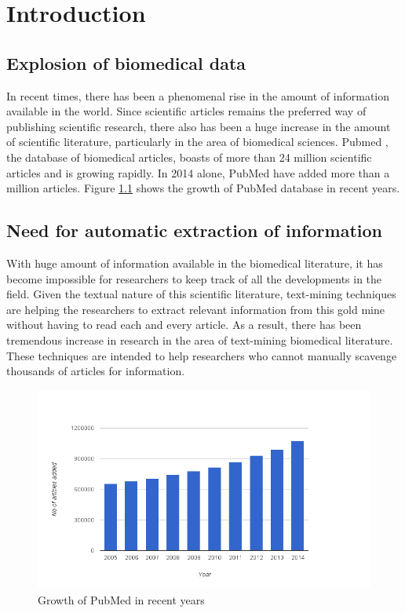\chapter{Introduction}\label{chapter:introduction}

\section{Explosion of biomedical data}

In recent times, there has been a phenomenal rise in the amount of information available in the world. Since scientific articles remains the preferred way of publishing scientific research, there also has been a huge increase in the amount of scientific literature, particularly in the area of biomedical sciences. Pubmed \cite{pubmed}, the database of biomedical articles, boasts of more than 24 million scientific articles and is growing rapidly. In 2014 alone, PubMed have added more than a million articles. Figure \ref{fig:PubMedTimeLine} shows the growth of PubMed database in recent years.

\section{Need for automatic extraction of information}

With huge amount of information available in the biomedical literature, it has become impossible for researchers to keep track of all the developments in the field. Given the textual nature of this scientific literature, text-mining techniques are helping the researchers to extract relevant information from this gold mine without having to read each and every article. As a result, there has been tremendous increase in research in the area of text-mining biomedical literature. These techniques are intended to help researchers who cannot manually scavenge thousands of articles for information.

\begin{figure}
\centering
\includegraphics[scale=0.4]{figures/PubMedTimeLine.png}
\caption{Growth of PubMed in recent years}\label{fig:PubMedTimeLine}
\end{figure}

